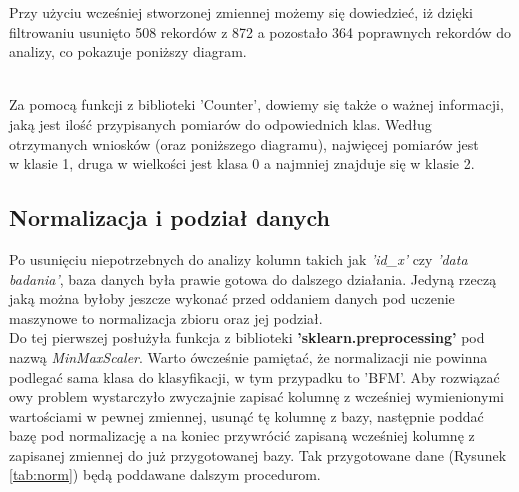 \documentclass{article}
\begin{document}
    Przy użyciu wcześniej stworzonej zmiennej możemy się dowiedzieć, iż dzięki filtrowaniu usunięto 508 rekordów z 872 a pozostało 364 poprawnych rekordów do analizy, co pokazuje poniższy diagram.\\
    
    \\
    
    Za pomocą funkcji z biblioteki 'Counter', dowiemy się także o ważnej informacji, jaką jest ilość przypisanych pomiarów do odpowiednich klas. Według otrzymanych wniosków (oraz poniższego diagramu), najwięcej pomiarów jest\\w klasie 1, druga w wielkości jest klasa 0 a najmniej znajduje się w klasie 2.\\
    
    

    \subsection{Normalizacja i podział danych}
    Po usunięciu niepotrzebnych do analizy kolumn takich jak \textit{'id\_x'} czy \textit{'data badania'}, baza danych była prawie gotowa do dalszego działania. Jedyną rzeczą jaką można byłoby jeszcze wykonać przed oddaniem danych pod uczenie maszynowe to  normalizacja zbioru oraz jej podział.\\
    Do tej pierwszej posłużyła funkcja z biblioteki \textbf{'sklearn.preprocessing'} pod nazwą \textit{MinMaxScaler}. Warto ówcześnie pamiętać, że normalizacji nie powinna podlegać sama klasa do klasyfikacji, w tym przypadku to 'BFM'. Aby rozwiązać owy problem wystarczyło zwyczajnie zapisać kolumnę z wcześniej wymienionymi wartościami w pewnej zmiennej, usunąć tę kolumnę z bazy, następnie poddać bazę pod normalizację a na koniec przywrócić zapisaną wcześniej kolumnę z zapisanej zmiennej do już przygotowanej bazy.
    Tak przygotowane dane (Rysunek \ref{tab:norm}) będą poddawane dalszym procedurom.\\
    
\end{document}
